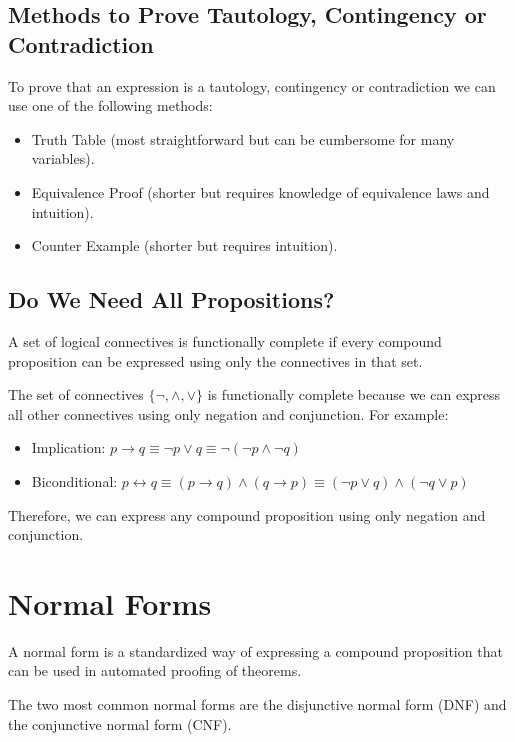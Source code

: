 \subsection{Methods to Prove Tautology, Contingency or Contradiction}
To prove that an expression is a tautology, contingency or contradiction we can use one of the following methods:
\begin{itemize}[itemsep=1pt,label=$\circ$]
    \item Truth Table (most straightforward but can be cumbersome for many variables).
    \item Equivalence Proof (shorter but requires knowledge of equivalence laws and intuition).
    \item Counter Example (shorter but requires intuition).
\end{itemize}

\subsection{Do We Need All Propositions?}
\begin{definition}
    A set of logical connectives is functionally complete if every compound proposition can be expressed using only the connectives in that set.
\end{definition}

\begin{eg}
    The set of connectives \(\{\neg, \land, \lor\}\) is functionally complete because we can express all other connectives using only negation and conjunction. For example:
    \begin{itemize}[itemsep=1pt,label=$\circ$]
        \item Implication: \(p \to q \equiv \neg p \lor q \equiv \neg (\neg p \land \neg q)\)
        \item Biconditional: \(p \leftrightarrow q \equiv (p \to q) \land (q \to p) \equiv (\neg p \lor q) \land (\neg q \lor p)\)
    \end{itemize}
    Therefore, we can express any compound proposition using only negation and conjunction.
\end{eg}

\section{Normal Forms}
\begin{definition}
    A normal form is a standardized way of expressing a compound proposition that can be used in automated proofing of theorems.
\end{definition}
The two most common normal forms are the disjunctive normal form (DNF) and the conjunctive normal form (CNF).

